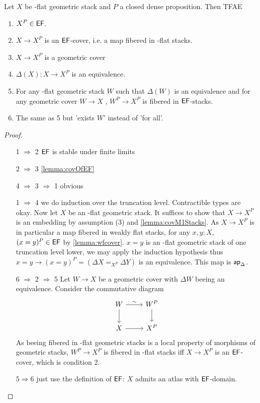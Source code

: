 \begin{lemma}{\label{lemma:ETALE}}
	Let $X$ be \etale-flat geometric stack and $P$ a closed dense proposition. Then TFAE
	\begin{enumerate}
		\item $X^P \in \mathsf{EF}$.
		\item $X \to X^P$ is an $\mathsf{EF}$-cover, i.e. a map fibered in \etale-flat stacks. %
		\item $X \to X^P$ is a geometric cover %
		\item $\Delta(X) : X \to X^P$ is an equivalence. 
		\item For any \etale-flat geometric stack $W$ such that $\Delta(W)$ is an equivalence and for any geometric cover $W \to X$ , $W^P \to X^P$ is fibered in $\mathsf{EF}$-stacks.
		\item The same as 5 but 'exists $W$' instead of 'for all'.
	\end{enumerate}
\end{lemma}
\begin{proof}
	\	\begin{enumerate}
		\item [1 $\Rightarrow$ 2] $\mathsf{EF}$ is stable under finite limits
		\item [2 $\Rightarrow$ 3] \ref{lemma:covOfEF}
		\item [4 $\Rightarrow$ 3 $\Rightarrow$ 1] obvious
		\item [1 $\Rightarrow$ 4]  we do induction over the truncation level. Contractible types are okay. Now let $X$ be an \etale-flat geometric stack. It suffices to show that $X \to X^P$ is an embedding by assumption (3) and \ref{lemma:covM1Stacks}. As $X \to X^P$ is in particular a map fibered in weakly flat stacks, for any $x,y : X$, $(x=y)^P \in \mathsf{EF}$ by \ref{lemma:wfcover}. $x = y$ is an \etale-flat geometric stack of one truncation level lower, we may apply the induction hypothesis thus $x = y \to (x = y)^P = (\Delta X =_{X^P} \Delta Y)$ is an equivalence. This map is $\mathsf{ap}_\Delta$.
		\item [ 6  $\Rightarrow$ 2 $\Rightarrow$ 5 ] Let $W \to X$ be a geometric cover with $\Delta W$ beeing an equivalence. Consider the commutative diagram
		\[\begin{tikzcd}
			W & {W^P} \\
			X & {X^P}
			\arrow["\sim", from=1-1, to=1-2]
			\arrow[from=1-1, to=2-1]
			\arrow[from=1-2, to=2-2]
			\arrow[from=2-1, to=2-2]
		\end{tikzcd}\]
		As beeing fibered in \etale-flat geometric stacks is a local property of morphisms of geometric stacks, $W^P \to X^P$ is fibered in \etale-flat stacks iff $X \to X^P$ is an $\mathsf{EF}$-cover, which is condition 2.
		\item [$5 \Rightarrow 6$] just use the definition of $\mathsf{EF}$: $X$ admits an atlas with $\mathsf{EF}$-domain.
		
	\end{enumerate}
\end{proof}
